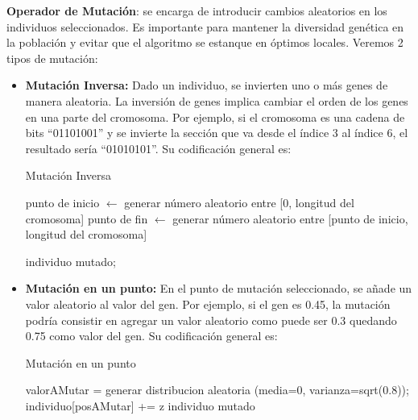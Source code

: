 \textbf{Operador de Mutación}: se encarga de introducir cambios aleatorios en los individuos seleccionados. Es importante para mantener la diversidad genética en la población y evitar que el algoritmo se estanque en óptimos locales. Veremos 2 tipos de mutación:

\begin{itemize}
	\item \textbf{Mutación Inversa:} Dado un individuo, se invierten uno o más genes de manera aleatoria. La inversión de genes implica cambiar el orden de los genes en una parte del cromosoma. Por ejemplo, si el cromosoma es una cadena de bits ``01101001'' y se invierte la sección que va desde el índice 3 al índice 6, el resultado sería ``01010101''. Su codificación general es:\\
\begin{algorithm}[H]
	\caption{Mutación Inversa}
	\SetAlgoLined
	
	
	\BlankLine
	\BlankLine

	punto de inicio $\leftarrow$ generar número aleatorio entre [0, longitud del cromosoma]\;
	punto de fin $\leftarrow$ generar número aleatorio entre [punto de inicio, longitud del cromosoma]\;
	
	\Return individuo mutado;
	
\end{algorithm}

	\item \textbf{Mutación en un punto:} En el punto de mutación seleccionado, se añade un valor aleatorio al valor del gen. Por ejemplo, si el gen es 0.45, la mutación podría consistir en agregar un valor aleatorio como puede ser 0.3 quedando 0.75 como valor del gen. Su codificación general es:\\
	\begin{algorithm}[H]
		\caption{Mutación en un punto}
		
		
		\BlankLine
		valorAMutar = generar distribucion aleatoria (media=0, varianza=sqrt(0.8));\\
		individuo[posAMutar] += z\;
		\BlankLine
		\Return individuo mutado\;
	\end{algorithm}
\end{itemize}




